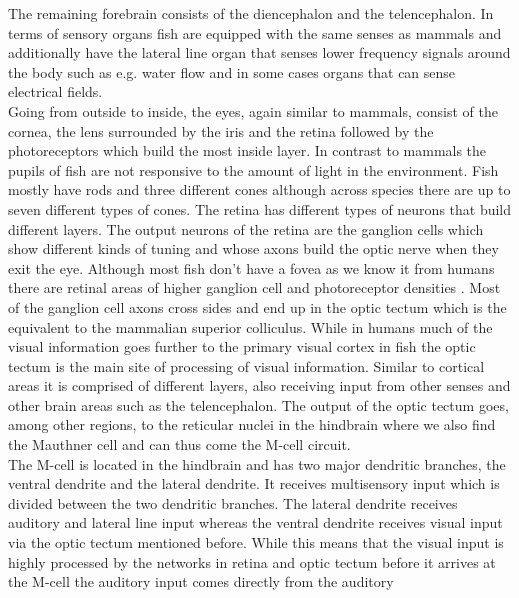\documentclass[a4paper,10pt,hidelinks]{scrreprt}
\begin{document}
	The remaining forebrain consists of the diencephalon and the telencephalon.
	In terms of sensory organs fish are equipped with the same senses as mammals and additionally 
	have the lateral line organ that senses lower frequency signals around the body such as e.g. 
	water flow and in some cases organs that can sense electrical fields.\\
	Going from outside to inside, the eyes, again similar to mammals, consist of the cornea, the 
	lens surrounded by the iris and the retina followed by the photoreceptors which build the most 
	inside layer.
	In contrast to mammals the pupils of fish are not responsive to the amount of light in the 
	environment.
	Fish mostly have rods and three different cones although across species there are up to seven 
	different types of cones.
	The retina has different types of neurons that build different layers.
	The output neurons of the retina are the ganglion cells which show different kinds of tuning 
	and whose axons build the optic nerve when they exit the eye.
	Although most fish don't have a fovea as we know it from humans there are retinal areas of 
	higher ganglion cell and photoreceptor densities \citep{Pita2015}.
	Most of the ganglion cell axons cross sides and end up in the optic tectum which is the 
	equivalent to the mammalian superior colliculus.
	While in humans much of the visual information goes further to the primary visual cortex in 
	fish the optic tectum is the main site of processing of visual information.
	Similar to cortical areas it is comprised of different layers, also receiving input from other 
	senses and other brain areas such as the telencephalon.
	The output of the optic tectum goes, among other regions, to the reticular nuclei in the 
	hindbrain where we also find the Mauthner cell and can thus come the M-cell circuit.\\
	The M-cell is located in the hindbrain and has two major dendritic branches, the ventral 
	dendrite and the lateral dendrite.
	It receives multisensory input which is divided between the two dendritic branches.
	The lateral dendrite receives auditory and lateral line input whereas the ventral dendrite 
	receives visual input via the optic tectum mentioned before.
	While this means that the visual input is highly processed by the networks in retina and optic 
	tectum before it arrives at the M-cell the auditory input comes directly from the auditory 
\end{document}
